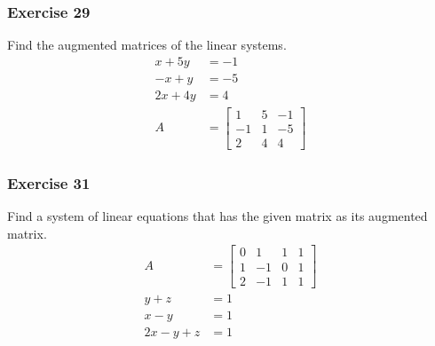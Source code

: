 \documentclass{math}
\begin{document}
\subsubsection*{Exercise 29}
Find the augmented matrices of the linear systems.
\begin{align*}
  x+5y &= -1 \\
  -x+y &= -5 \\
  2x+4y &= 4 \\
  A &= \left[\begin{array}{cc|c}
    1 & 5 & -1 \\
    -1 & 1 & -5 \\
    2 & 4 & 4
  \end{array}\right]
\end{align*}

\subsubsection*{Exercise 31}
Find a system of linear equations that has the given matrix as its augmented
matrix.
\begin{align*}
  A &= \left[\begin{array}{ccc|c}
    0 & 1 & 1 & 1 \\
    1 & -1 & 0 & 1 \\
    2 & -1 & 1 & 1
  \end{array}\right] \\
  y+z &= 1 \\
  x-y &= 1 \\
  2x-y+z &= 1
\end{align*}
\end{document}

